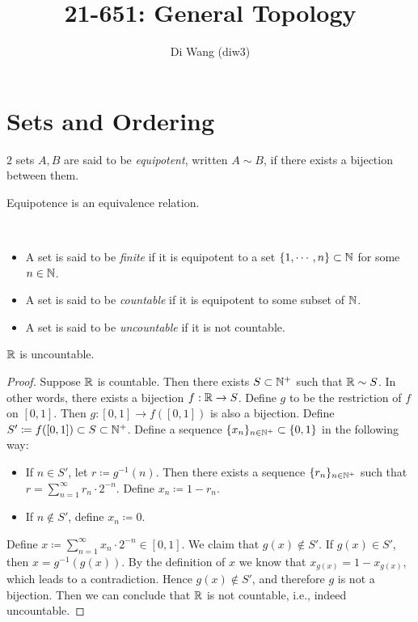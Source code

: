 \documentclass{techreport}
\begin{document}
\title{21-651: General Topology}
\author{Di Wang (diw3)}
\maketitle

\section{Sets and Ordering}

\begin{definition}
	$2$ sets $A,B$ are said to be \emph{equipotent}, written $A \sim B$, if there exists a bijection between them.
\end{definition}

\begin{remark}
	Equipotence is an equivalence relation.
\end{remark}

\begin{definition}\
	\begin{itemize}
		\item A set is said to be \emph{finite} if it is equipotent to a set $\{1,\cdots,n\} \subset \mathbb{N}$ for some $n \in \mathbb{N}$.
		\item A set is said to be \emph{countable} if it is equipotent to some subset of $\mathbb{N}$.
		\item A set is said to be \emph{uncountable} if it is not countable.
	\end{itemize}
\end{definition}

\begin{proposition}
	$\mathbb{R}$ is uncountable.
\end{proposition}
\begin{proof}
	Suppose $\mathbb{R}$ is countable.
	Then there exists $S \subset \mathbb{N}^+$ such that $\mathbb{R} \sim S$.
	In other words, there exists a bijection $f : \mathbb{R} \to S$.
	Define $g$ to be the restriction of $f$ on $[0,1]$.
	Then $g : [0,1] \to f([0,1])$ is also a bijection.
	Define $S' \coloneqq f([0,1]) \subset S \subset \mathbb{N}^+$.
	Define a sequence $\{x_n\}_{n \in \mathbb{N}^+} \subset \{0,1\}$ in the following way:
	\begin{itemize}
		\item If $n \in S'$, let $r \coloneqq g^{-1}(n)$.
		Then there exists a sequence $\{ r_n\}_{n \in \mathbb{N}^+}$ such that $r = \sum_{n=1}^\infty r_n \cdot 2^{-n}$.
		Define $x_n \coloneqq 1 - r_n$.
		\item If $n \not\in S'$, define $x_n \coloneqq 0$.
	\end{itemize}
	Define $x \coloneqq \sum_{n=1}^\infty x_n \cdot 2^{-n} \in [0,1]$.
	We claim that $g(x) \not\in S'$.
	If $g(x) \in S'$, then $x = g^{-1}(g(x))$. By the definition of $x$ we know that $x_{g(x)} = 1-x_{g(x)}$, which leads to a contradiction.
	Hence $g(x) \not\in S'$, and therefore $g$ is not a bijection.
	Then we can conclude that $\mathbb{R}$ is not countable, i.e., indeed uncountable.
\end{proof}
\end{document}
